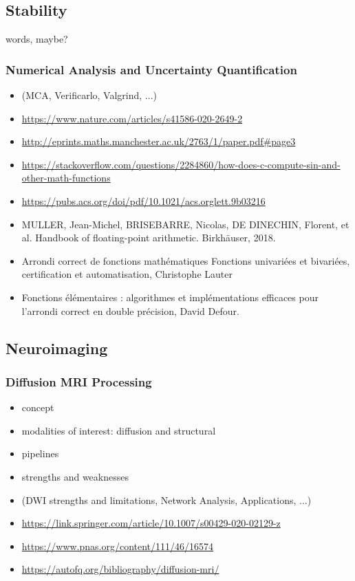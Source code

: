 \subsection{Stability}
words, maybe?

\subsubsection{Numerical Analysis and Uncertainty Quantification}
\begin{itemize}
\item (MCA, Verificarlo, Valgrind, ...)
\item \url{https://www.nature.com/articles/s41586-020-2649-2}
\item \url{http://eprints.maths.manchester.ac.uk/2763/1/paper.pdf#page3}
\item \url{https://stackoverflow.com/questions/2284860/how-does-c-compute-sin-and-other-math-functions}
\item \url{https://pubs.acs.org/doi/pdf/10.1021/acs.orglett.9b03216}
\item MULLER, Jean-Michel, BRISEBARRE, Nicolas, DE DINECHIN, Florent, et al. Handbook of floating-point arithmetic. Birkhäuser, 2018.
\item Arrondi correct de fonctions mathématiques Fonctions univariées et bivariées, certification et automatisation, Christophe Lauter
\item Fonctions élémentaires : algorithmes et implémentations efficaces pour l'arrondi correct en double précision, David Defour.
\end{itemize}


\subsection{Neuroimaging}

\subsubsection{Diffusion MRI Processing}
\begin{itemize}
\item concept
\item modalities of interest: diffusion and structural
\item pipelines
\item strengths and weaknesses
\item (DWI strengths and limitations, Network Analysis, Applications, ...)
\item \url{https://link.springer.com/article/10.1007/s00429-020-02129-z}
\item \url{https://www.pnas.org/content/111/46/16574}
\item \url{https://autofq.org/bibliography/diffusion-mri/}
\end{itemize}

